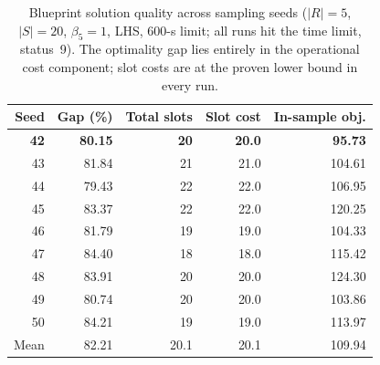 \begin{table}[h]
  \centering
  \caption{Blueprint solution quality across sampling seeds
           ($|R|=5$, $|S|=20$, $\beta_5=1$, LHS, 600-s limit;
           all runs hit the time limit, status~9).
           The optimality gap lies entirely in the operational cost component;
           slot costs are at the proven lower bound in every run.}
  \label{tab:bp_seeds_quality}
  \setlength{\tabcolsep}{5pt}
  \begin{tabular}{rrrrr}
    \toprule
    Seed & Gap (\%) & Total slots & Slot cost & In-sample obj. \\
    \midrule
    \textbf{42} & \textbf{80.15} & \textbf{20} & \textbf{20.0} & \textbf{95.73} \\
    43 & 81.84 & 21 & 21.0 & 104.61 \\
    44 & 79.43 & 22 & 22.0 & 106.95 \\
    45 & 83.37 & 22 & 22.0 & 120.25 \\
    46 & 81.79 & 19 & 19.0 & 104.33 \\
    47 & 84.40 & 18 & 18.0 & 115.42 \\
    48 & 83.91 & 20 & 20.0 & 124.30 \\
    49 & 80.74 & 20 & 20.0 & 103.86 \\
    50 & 84.21 & 19 & 19.0 & 113.97 \\
    \midrule
    Mean & 82.21 & 20.1 & 20.1 & 109.94 \\
    \bottomrule
  \end{tabular}
\end{table}

